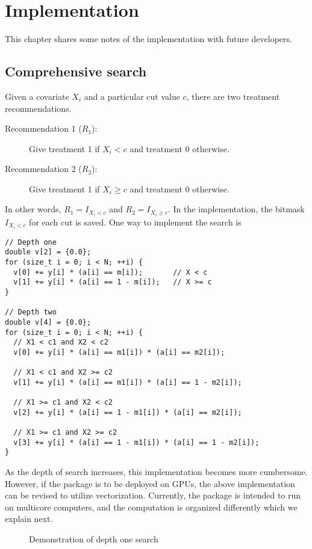 \chapter{Implementation}

This chapter shares some notes of the implementation with future developers. 

\section{Comprehensive search}
Given a covariate $X_i$ and a particular cut value $c$, there are two
treatment recommendations. 
\begin{description}
\item[Recommendation 1 ($R_1$):] Give treatment 1 if $X_i < c$ and treatment 0
  otherwise.
\item[Recommendation 2 ($R_2$):] Give treatment 1 if $X_i \geq c$ and treatment 0
  otherwise. 
\end{description}
In other words, $R_1=I_{X_i < c}$ and $R_2=I_{X_i \geq c}$. In the implementation,
the bitmask $I_{X_i<c}$ for each cut is saved. One way to implement the search is

\begin{lstlisting}
// Depth one 
double v[2] = {0.0}; 
for (size_t i = 0; i < N; ++i) {
  v[0] += y[i] * (a[i] == m[i]);       // X < c
  v[1] += y[i] * (a[i] == 1 - m[i]);   // X >= c
}

// Depth two 
double v[4] = {0.0}; 
for (size_t i = 0; i < N; ++i) {
  // X1 < c1 and X2 < c2
  v[0] += y[i] * (a[i] == m1[i]) * (a[i] == m2[i]); 
  
  // X1 < c1 and X2 >= c2
  v[1] += y[i] * (a[i] == m1[i]) * (a[i] == 1 - m2[i]);

  // X1 >= c1 and X2 < c2
  v[2] += y[i] * (a[i] == 1 - m1[i]) * (a[i] == m2[i]);

  // X1 >= c1 and X2 >= c2 
  v[3] += y[i] * (a[i] == 1 - m1[i]) * (a[i] == 1 - m2[i]);
}
\end{lstlisting}
As the depth of search increases, this implementation becomes more cumbersome.
However, if the package is to be deployed on GPUs, the above implementation
can be revised to utilize vectorization. Currently, the package is intended to
run on multicore computers, and the computation is organized differently which
we explain next. 

\begin{figure}[h]
  \centering
  \caption{Demonstration of depth one search}
  \label{fig:depth1}
\end{figure}

